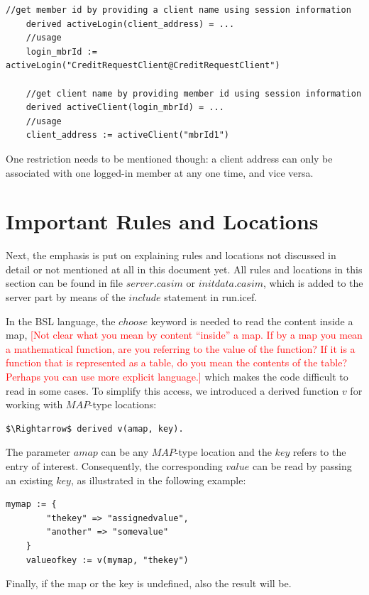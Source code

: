 \begin{lstlisting}[language=bsl]
	//get member id by providing a client name using session information
	derived activeLogin(client_address) = ...
	//usage
	login_mbrId := activeLogin("CreditRequestClient@CreditRequestClient")
	
	//get client name by providing member id using session information
	derived activeClient(login_mbrId) = ...
	//usage
	client_address := activeClient("mbrId1")
\end{lstlisting}

One restriction needs to be mentioned though: a client address can only be associated with one logged-in member at any one time, and vice versa.

\section{Important Rules and Locations}
\label{sec:impl-rules}

Next, the emphasis is put on explaining rules and locations not discussed in detail or not mentioned at all in this document yet. All rules and locations in this section can be found in file $server.casim$ or $initdata.casim$, which is added to the server part by means of the $include$ statement in run.icef.

In the BSL language, the $choose$ keyword is needed to read the content inside a map, 
\textcolor{red}{[Not clear what you mean by content ``inside'' a map. If by a map you mean a mathematical function, are you referring to the value of the function? If it is a function that is represented as a table, do you mean the contents of the table? Perhaps you can use more explicit language.]} which makes the code difficult to read in some cases. To simplify this access, we introduced a derived function $v$ for working with $MAP$-type locations:
\begin{lstlisting}[language=bsl,mathescape=true]
	$\Rightarrow$ derived v(amap, key).
\end{lstlisting}

The parameter $amap$ can be any $MAP$-type location and the $key$ refers to the entry of interest. Consequently, the corresponding $value$ can be read by passing an existing $key$, as illustrated in the following example:
\begin{lstlisting}[language=bsl,mathescape=true]
	mymap := {
		"thekey" => "assignedvalue",
		"another" => "somevalue"		
	}
	valueofkey := v(mymap, "thekey")
\end{lstlisting}
Finally, if the map or the key is undefined, also the result will be.

